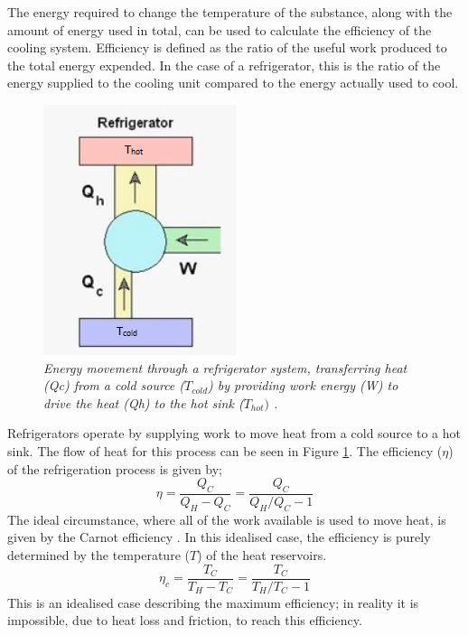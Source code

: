 \documentclass[10pt]{article}
\begin{document}
The energy required to change the temperature of the substance, along with the amount of energy used in total, can be used to calculate the efficiency of the cooling system. Efficiency is defined as the ratio of the useful work produced to the total energy expended. In the case of a refrigerator, this is the ratio of the energy supplied to the cooling unit compared to the energy actually used to cool.\\

\begin{figure}[h!]
    \centering
    \includegraphics[scale=.75]{ref.jpg}
    \caption{\it{Energy movement through a refrigerator system, transferring heat (Qc) from a cold source ($T_{cold}$) by providing work energy (W) to drive the heat (Qh) to the hot sink ($T_{hot})$ \cite{fridge}.}}
    \label{fig:fridge}
\end{figure}

Refrigerators operate by supplying work to move heat from a cold source to a hot sink. The flow of heat for this process can be seen in Figure \ref{fig:fridge}. The efficiency ($\eta$) of the refrigeration process is given by;
\begin{equation}\label{eq:eff}
    \eta = \frac{Q_C}{Q_H-Q_C}=\frac{Q_C}{Q_H/Q_C - 1}
\end{equation}
The ideal circumstance, where all of the work available is used to move heat, is given by the Carnot efficiency \cite{carnot}. In this idealised case, the efficiency is purely determined by the temperature ($T$) of the heat reservoirs.
\begin{equation}\label{eq:carn_eff}
        \eta_c = \frac{T_C}{T_H-T_C}=\frac{T_C}{T_H/T_C - 1}
\end{equation}
This is an idealised case describing the maximum efficiency; in reality it is impossible, due to heat loss and friction, to reach this efficiency. 
\end{document}
